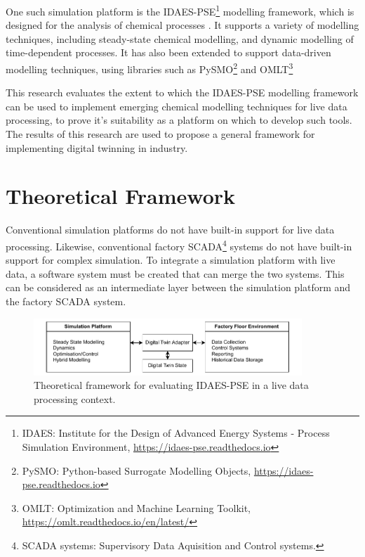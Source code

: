 \documentclass[12pt]{article}
\begin{document}
One such simulation platform is the IDAES-PSE\footnote{IDAES: Institute for the Design of Advanced Energy Systems - Process Simulation Environment, \href{https://idaes-pse.readthedocs.io}{https://idaes-pse.readthedocs.io}} modelling framework, which is designed for the analysis of chemical processes \cite{lee2021idaes}. It supports a variety of modelling techniques, including steady-state chemical modelling, and dynamic modelling of time-dependent processes. 
It has also been extended to support data-driven modelling techniques, using libraries such as PySMO\footnote{PySMO: Python-based Surrogate Modelling Objects, \href{https://idaes-pse.readthedocs.io/en/stable/explanations/modeling_extensions/surrogate/api/pysmo/index.html}{https://idaes-pse.readthedocs.io}} and OMLT\footnote{OMLT: Optimization and Machine Learning Toolkit, \href{https://omlt.readthedocs.io/en/latest/}{https://omlt.readthedocs.io/en/latest/}} \cite{cecconOMLTOptimizationMachine2022} 


This research evaluates the extent to which the IDAES-PSE modelling framework can be used to implement emerging chemical modelling techniques for live data processing, to prove it's suitability as a platform on which to develop such tools.
The results of this research are used to propose a general framework for implementing digital twinning in industry.


\section{Theoretical Framework}

Conventional simulation platforms do not have built-in support for live data processing. Likewise, conventional factory SCADA\footnote{SCADA systems: Supervisory Data Aquisition and Control systems.} systems do not have built-in support for complex simulation. To integrate a simulation platform with live data, a software system must be created that can merge the two systems. This can be considered as an intermediate layer between the simulation platform and the factory SCADA system.


\begin{figure}[h]
    \centering
    \includegraphics[width=0.9\textwidth]{research_journal_framework.pdf}
    \caption{Theoretical framework for evaluating IDAES-PSE in a live data processing context.}
    \label{fig:theoretical_framework}
\end{figure}
\end{document}
